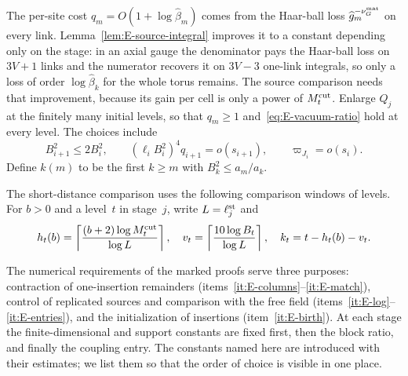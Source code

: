 The per-site cost $q_m=O(1+\log\widehat\beta_m)$ comes from the Haar-ball loss $\widehat g_m^{-\nu_G^{\rm mat}}$ on every link. Lemma~\ref{lem:E-source-integral} improves it to a constant depending only on the stage: in an axial gauge the denominator pays the Haar-ball loss on $3V+1$ links and the numerator recovers it on $3V-3$ one-link integrals, so only a loss of order $\log\widehat\beta_k$ for the whole torus remains. The source comparison needs that improvement, because its gain per cell is only a power of $M^{\mathrm{cut}}_t$. Enlarge $Q_j$ at the finitely many initial levels, so that $q_m\ge1$ and~\eqref{eq:E-vacuum-ratio} hold at every level. The choices include
\begin{equation}\label{eq:E-marker-scales}
 B_{i+1}^2\le2B_i^2,\qquad (\ell_iB_i^2)^4q_{i+1}=o(s_{i+1}),\qquad
 \varpi_{J_i}=o(s_i).
\end{equation}
Define $k(m)$ to be the first $k\ge m$ with $B_k^2\le a_m/a_k$.

The short-distance comparison uses the following comparison windows of levels. For $b>0$ and a level~$t$ in stage~$j$, write $L=\ell_j^{\rm st}$ and
\begin{equation}\label{eq:E-window}
 h_t(b)=\left\lceil\frac{(b+2)\log M^{\mathrm{cut}}_t}{\log L}\right\rceil,
 \quad v_t=\left\lceil\frac{10\log B_t}{\log L}\right\rceil,
 \quad k_t=t-h_t(b)-v_t.
\end{equation}

The numerical requirements of the marked proofs serve three purposes: contraction of one-insertion remainders (items~\ref{it:E-columns}--\ref{it:E-match}), control of replicated sources and comparison with the free field (items~\ref{it:E-log}--\ref{it:E-entries}), and the initialization of insertions (item~\ref{it:E-birth}). At each stage the finite-dimensional and support constants are fixed first, then the block ratio, and finally the coupling entry. The constants named here are introduced with their estimates; we list them so that the order of choice is visible in one place.

